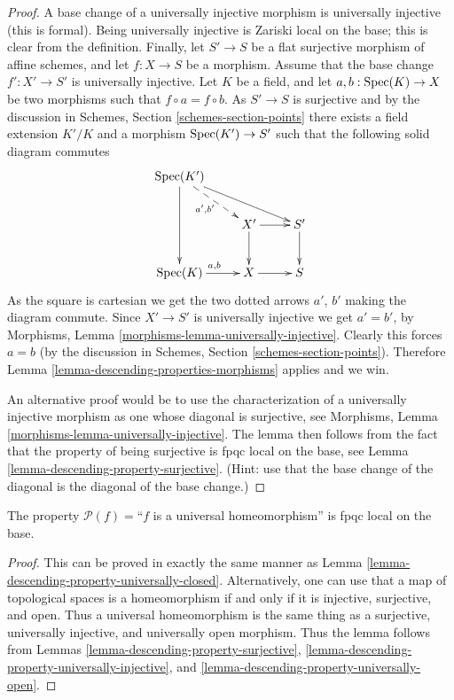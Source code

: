 \begin{proof}
A base change of a universally injective morphism is universally
injective (this is formal). Being universally injective is Zariski
local on the base; this is clear from the definition.
Finally, let
$S' \to S$ be a flat surjective morphism of affine schemes,
and let $f : X \to S$ be a morphism. Assume that the base change
$f' : X' \to S'$ is universally injective. Let $K$ be a field, and let
$a, b : \mathop{\mathrm{Spec}}(K) \to X$ be two morphisms such that
$f \circ a = f \circ b$. As $S' \to S$ is surjective and
by the discussion in Schemes,
Section \ref{schemes-section-points} there exists a field
extension $K'/K$ and a morphism $\mathop{\mathrm{Spec}}(K')
\to S'$ such that the following solid diagram commutes
$$
\xymatrix{
\Spec(K') \ar[rrd] \ar@{-->}[rd]_{a', b'} \ar[dd] \\
 &
X' \ar[r] \ar[d] &
S' \ar[d] \\
\Spec(K) \ar[r]^{a, b} &
X \ar[r] &
S
}
$$
As the square is cartesian we get the two dotted arrows $a'$, $b'$ making the
diagram commute. Since $X' \to S'$ is universally injective we get $a' = b'$,
by
Morphisms, Lemma \ref{morphisms-lemma-universally-injective}.
Clearly this forces $a = b$ (by the discussion in Schemes,
Section \ref{schemes-section-points}).
Therefore Lemma \ref{lemma-descending-properties-morphisms} applies and we win.

\medskip\noindent
An alternative proof would be to use the characterization of a universally
injective morphism as one whose diagonal is surjective, see
Morphisms, Lemma \ref{morphisms-lemma-universally-injective}.
The lemma then follows from the fact that
the property of being surjective is fpqc local on the base, see
Lemma \ref{lemma-descending-property-surjective}.
(Hint: use that the base change of the diagonal is the diagonal
of the base change.)
\end{proof}

\begin{lemma}
\label{lemma-descending-property-universal-homeomorphism}
The property $\mathcal{P}(f) =$``$f$ is a universal homeomorphism''
is fpqc local on the base.
\end{lemma}

\begin{proof}
This can be proved in exactly the same manner as
Lemma \ref{lemma-descending-property-universally-closed}.
Alternatively, one can use that
a map of topological spaces is a homeomorphism if and only if
it is injective, surjective, and open. Thus
a universal homeomorphism is the same thing as a
surjective, universally injective, and universally open morphism.
Thus the lemma follows from
Lemmas \ref{lemma-descending-property-surjective},
\ref{lemma-descending-property-universally-injective}, and
\ref{lemma-descending-property-universally-open}.
\end{proof}


